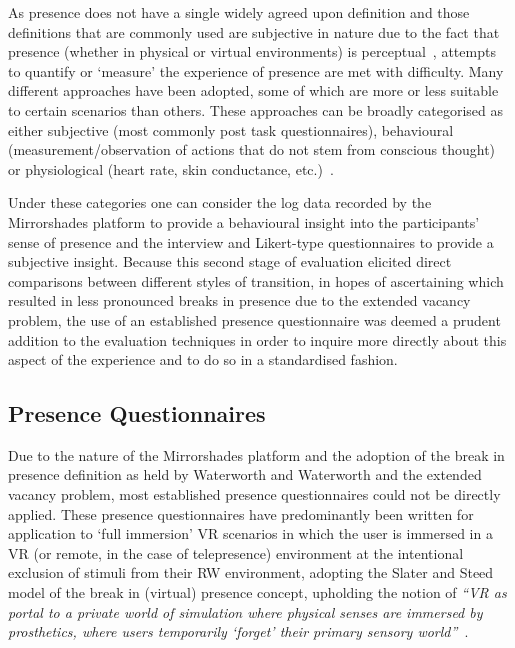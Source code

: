 As presence does not have a single widely agreed upon definition and those definitions that are commonly used are subjective in nature due to the fact that presence (whether in physical or virtual environments) is perceptual~\cite{Waterworth2014}, attempts to quantify or `measure' the experience of presence are met with difficulty. Many different approaches have been adopted, some of which are more or less suitable to certain scenarios than others. These approaches can be broadly categorised as either subjective (most commonly post task questionnaires), behavioural (measurement/observation of actions that do not stem from conscious thought) or physiological (heart rate, skin conductance, etc.)~\cite{Insko2003}.

Under these categories one can consider the log data recorded by the Mirrorshades platform to provide a behavioural insight into the participants' sense of presence and the interview and Likert-type questionnaires to provide a subjective insight. Because this second stage of evaluation elicited direct comparisons between different styles of transition, in hopes of ascertaining which resulted in less pronounced breaks in presence due to the extended vacancy problem, the use of an established presence questionnaire was deemed a prudent addition to the evaluation techniques in order to inquire more directly about this aspect of the experience and to do so in a standardised fashion.


\subsection{Presence Questionnaires}
\label{presence-questionnaires}
Due to the nature of the Mirrorshades platform and the adoption of the break in presence definition as held by Waterworth and Waterworth and the extended vacancy problem, most established presence questionnaires could not be directly applied. These presence questionnaires have predominantly been written for application to `full immersion' VR scenarios in which the user is immersed in a VR (or remote, in the case of telepresence) environment at the intentional exclusion of stimuli from their RW environment, adopting the Slater and Steed model of the break in (virtual) presence concept, upholding the notion of \textit{``VR as portal to a private world of simulation where physical senses are immersed by prosthetics, where users temporarily `forget' their primary sensory world''}~\cite{Heim2014}.

